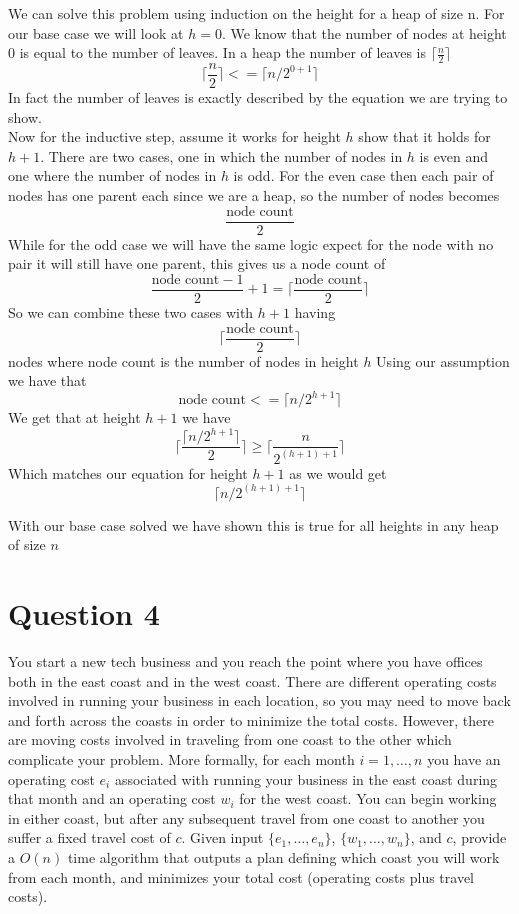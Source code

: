 \documentclass{article}
\begin{document}
We can solve this problem using induction on the height for a heap of size n.
For our base case we will look at $h = 0$.
We know that the number of nodes at height $0$ is equal to the number of leaves.
In a heap the number of leaves is $\lceil \frac{n}{2} \rceil$
$$ \lceil \frac{n}{2} \rceil <= \lceil n/2^{0+1}\rceil $$
In fact the number of leaves is exactly described by the equation we are trying to show.
\\
Now for the inductive step, assume it works for height $h$ show that it holds for $h+1$.
There are two cases, one in which the number of nodes in $h$ is even and one where the number of nodes in $h$ is odd.
For the even case then each pair of nodes has one parent each since we are a heap, so the number of nodes becomes
$$\frac{\text{node count}}{2}$$
While for the odd case we will have the same logic expect for the node with no pair it will still have one parent, this gives us a node count of
$$\frac{\text{node count} - 1}{2} + 1 = \lceil \frac{\text{node count}}{2} \rceil$$
So we can combine these two cases with $h+1$ having
$$\lceil \frac{\text{node count}}{2} \rceil$$
nodes where node count is the number of nodes in height $h$
Using our assumption we have that
$$\text{node count} <= \lceil n/2^{h+1}\rceil$$
We get that at height $h+1$ we have
$$\lceil \frac{\lceil n/2^{h+1}\rceil}{2} \rceil \ge \lceil \frac{n}{2^{(h+1)+1}} \rceil$$
Which matches our equation for height $h+1$ as we would get
$$\lceil n/2^{(h+1)+1}\rceil $$

With our base case solved we have shown this is true for all heights in any heap of size $n$

\section*{Question 4}
You start a new tech business and you reach the point where you have offices both in the
east coast and in the west coast. There are different operating costs involved in running your business
in each location, so you may need to move back and forth across the coasts in order to minimize the total
costs. However, there are moving costs involved in traveling from one coast to the other which complicate
your problem. More formally, for each month $i=1,\dots, n$ you have an operating cost $e_i$ associated
with running your business in the east coast during that month and an operating cost $w_i$ for the west coast.
You can begin working in either coast, but after any subsequent travel from one coast to another you suffer
a fixed travel cost of $c$. Given input $\{e_1,\dots, e_n\}$, $\{w_1,\dots, w_n\}$, and $c$, provide a $O(n)$
time algorithm that outputs a plan defining which coast you will work from each month, and minimizes your
total cost (operating costs plus travel costs).
\newline
\newline
\end{document}
